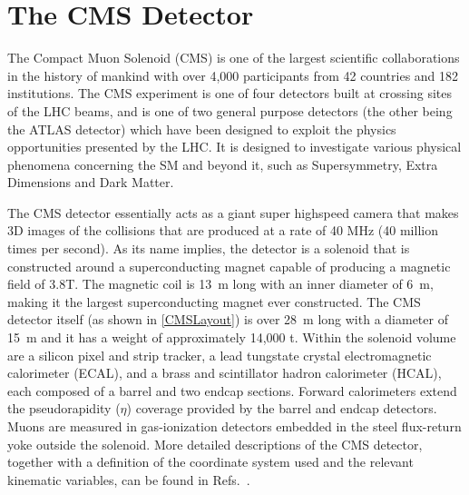 \chapter{The CMS Detector\label{ch:CMS}}

The Compact Muon Solenoid (CMS) is one of the largest scientific collaborations in the history of mankind with over 4,000 participants from 42 countries and 182 institutions.
The CMS experiment is one of four detectors built at crossing sites of the LHC beams, and is one of two general purpose detectors (the other being the ATLAS detector) which have been designed to exploit the physics opportunities presented by the LHC.
It is designed to investigate various physical phenomena concerning the SM and beyond it, such as Supersymmetry, Extra Dimensions and Dark Matter.

The CMS detector essentially acts as a giant super highspeed camera that makes 3D images of the collisions that are produced at a rate of 40 MHz (40 million times per second).
As its name implies, the detector is a solenoid that is constructed around a superconducting magnet capable of producing a magnetic field of 3.8\unit{\tesla}.
The magnetic coil is \qty{13}{\m} long with an inner diameter of \qty{6}{\meter}, making it the largest superconducting magnet ever constructed.
The CMS detector itself  (as shown in \autoref{CMSLayout}) is over \qty{28}{m} long with a diameter of \qty{15}{\m} and it has a weight of approximately 14,000 \unit{\tonne}.
Within the solenoid volume are a silicon pixel and strip tracker, a lead tungstate crystal electromagnetic calorimeter (ECAL), and a brass and scintillator hadron calorimeter (HCAL), each composed of a barrel and two endcap sections. Forward calorimeters extend the pseudorapidity ($\eta$) coverage provided by the barrel and endcap detectors. Muons are measured in gas-ionization detectors embedded in the steel flux-return yoke outside the solenoid. More detailed descriptions of the CMS detector, together with a definition of the coordinate system used and the relevant kinematic variables, can be found in Refs.~\cite{CMS:2008xjf,CMS:2023gfb}.




